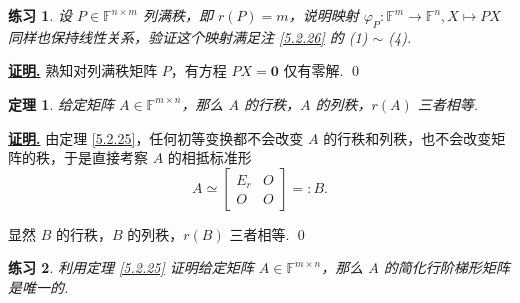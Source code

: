 \documentclass[10pt,openany]{article}
\theoremstyle{thmstyle} %
\newtheorem{theorem}{定理}[subsection]
\newtheorem{practice}{练习}[section]
\theoremstyle{defstyle} %
\theoremstyle{prostyle} %
\theoremstyle{exastyle}
\theoremstyle{remstyle}
\renewenvironment{proof}[1][证明]{\par\underline{\textbf{#1.}} \;\fangsong}{\qed\par}
\newcommand{\F}{\mathbb{F}}
\newcommand{\mn}{^{m \times n}}
\begin{document}
\begin{practice} \label{prac5.2}
	设 \( P \in \F^{n \times m} \) 列满秩，即 \( r(P)=m \)，说明映射 \( \varphi_P: \F^m \to \F^n, X \mapsto PX \) 同样也保持线性关系，验证这个映射满足注 \ref{5.2.26} 的 (1) \( \sim \) (4).
\end{practice}

\begin{proof}
	熟知对列满秩矩阵 \( P \)，有方程 \( PX=\bm{0} \) 仅有零解.
\end{proof}

\begin{theorem} \label{5.2.27}
	给定矩阵 \( A \in \F\mn \)，那么 \( A \) 的行秩，\( A \) 的列秩，\( r(A) \) 三者相等.
\end{theorem}

\begin{proof}
	由定理 \ref{5.2.25}，任何初等变换都不会改变 \( A \) 的行秩和列秩，也不会改变矩阵的秩，于是直接考察 \( A \) 的相抵标准形
	\[ A \simeq \begin{bmatrix}
		E_r & O \\
		O & O
	\end{bmatrix}=:B. \]
	
	显然 \( B \) 的行秩，\( B \) 的列秩，\( r(B) \) 三者相等. 
\end{proof}

\begin{practice}
	利用定理 \ref{5.2.25} 证明给定矩阵 \( A \in \F\mn \)，那么 \( A \) 的简化行阶梯形矩阵是唯一的.
\end{practice}
\end{document}
